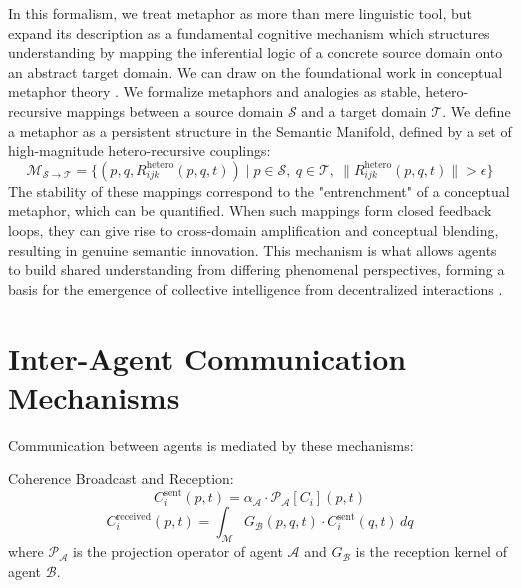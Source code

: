 In this formalism, we treat metaphor as more than mere linguistic tool, but expand its description as a fundamental cognitive mechanism which structures understanding by mapping the inferential logic of a concrete source domain onto an abstract target domain. We can draw on the foundational work in conceptual metaphor theory \autocite{LakoffJohnson1980, HofstadterSander2013}. We formalize metaphors and analogies as stable, hetero-recursive mappings between a source domain \(\mathcal{S}\) and a target domain \(\mathcal{T}\). We define a metaphor as a persistent structure in the Semantic Manifold, defined by a set of high-magnitude hetero-recursive couplings:
\begin{equation}
\mathcal{M}_{\mathcal{S} \to \mathcal{T}} = \{(p, q, R_{ijk}^{\text{hetero}}(p, q, t)) \mid p \in \mathcal{S},\ q \in \mathcal{T},\ \|R_{ijk}^{\text{hetero}}(p, q, t)\| > \epsilon\}
\end{equation}
The stability of these mappings correspond to the "entrenchment" of a conceptual metaphor, which can be quantified. When such mappings form closed feedback loops, they can give rise to cross-domain amplification and conceptual blending, resulting in genuine semantic innovation. This mechanism is what allows agents to build shared understanding from differing phenomenal perspectives, forming a basis for the emergence of collective intelligence from decentralized interactions \autocite{Surowiecki2004}.


\section{Inter-Agent Communication Mechanisms}
\label{sec:inter_agent_communication_mechanisms}

Communication between agents is mediated by these mechanisms:

Coherence Broadcast and Reception:
\begin{equation}
C_i^{\mathrm{sent}}(p,t) = \alpha_{\mathcal{A}} \cdot \mathcal{P}_{\mathcal{A}}[C_i](p,t)
\end{equation}
\begin{equation}
C_i^{\mathrm{received}}(p,t) = \int_{\mathcal{M}} G_{\mathcal{B}}(p,q,t) \cdot C_i^{\mathrm{sent}}(q,t) \, dq
\end{equation}
where \(\mathcal{P}_{\mathcal{A}}\) is the projection operator of agent \(\mathcal{A}\) and \(G_{\mathcal{B}}\) is the reception kernel of agent \(\mathcal{B}\).

